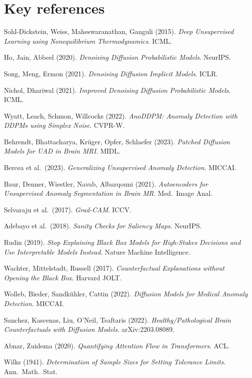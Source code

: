\section*{Key references}
\begin{enumerate}[label={[\arabic*]},leftmargin=2.4em]
\item Sohl-Dickstein, Weiss, Maheswaranathan, Ganguli (2015). \textit{Deep Unsupervised Learning using Nonequilibrium Thermodynamics}. ICML.
\item Ho, Jain, Abbeel (2020). \textit{Denoising Diffusion Probabilistic Models}. NeurIPS.
\item Song, Meng, Ermon (2021). \textit{Denoising Diffusion Implicit Models}. ICLR.
\item Nichol, Dhariwal (2021). \textit{Improved Denoising Diffusion Probabilistic Models}. ICML.
\item Wyatt, Leach, Schmon, Willcocks (2022). \textit{AnoDDPM: Anomaly Detection with DDPMs using Simplex Noise}. CVPR-W.
\item Behrendt, Bhattacharya, Kr\"uger, Opfer, Schlaefer (2023). \textit{Patched Diffusion Models for UAD in Brain MRI}. MIDL.
\item Bercea et al.\ (2023). \textit{Generalizing Unsupervised Anomaly Detection}. MICCAI.
\item Baur, Denner, Wiestler, Navab, Albarqouni (2021). \textit{Autoencoders for Unsupervised Anomaly Segmentation in Brain MR}. Med.\ Image Anal.
\item Selvaraju et al.\ (2017). \textit{Grad-CAM}. ICCV.
\item Adebayo et al.\ (2018). \textit{Sanity Checks for Saliency Maps}. NeurIPS.
\item Rudin (2019). \textit{Stop Explaining Black Box Models for High-Stakes Decisions and Use Interpretable Models Instead}. Nature Machine Intelligence.
\item Wachter, Mittelstadt, Russell (2017). \textit{Counterfactual Explanations without Opening the Black Box}. Harvard JOLT.
\item Wolleb, Bieder, Sandk\"uhler, Cattin (2022). \textit{Diffusion Models for Medical Anomaly Detection}. MICCAI.
\item Sanchez, Kascenas, Liu, O'Neil, Tsaftaris (2022). \textit{Healthy/Pathological Brain Counterfactuals with Diffusion Models}. arXiv:2203.08089.
\item Abnar, Zuidema (2020). \textit{Quantifying Attention Flow in Transformers}. ACL.
\item Wilks (1941). \textit{Determination of Sample Sizes for Setting Tolerance Limits}. Ann.\ Math.\ Stat.
\end{enumerate}

